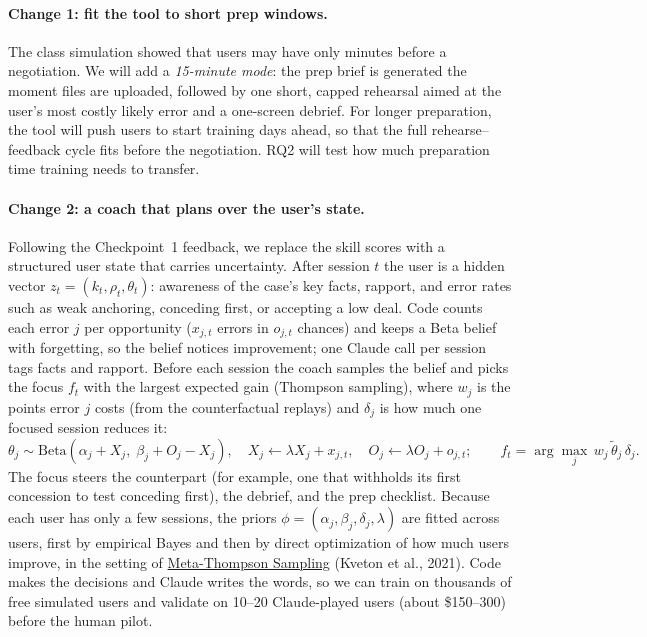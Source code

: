 \documentclass[10pt]{article}
\begin{document}
\paragraph{Change 1: fit the tool to short prep windows.} The class simulation showed that
users may have only minutes before a negotiation. We will add a \emph{15-minute mode}: the
prep brief is generated the moment files are uploaded, followed by one short, capped
rehearsal aimed at the user's most costly likely error and a one-screen debrief. For
longer preparation, the tool will push users to start training days ahead, so that the
full rehearse--feedback cycle fits before the negotiation. RQ2 will test how much
preparation time training needs to transfer.

\paragraph{Change 2: a coach that plans over the user's state.} Following the Checkpoint~1
feedback, we replace the skill scores with a structured user state that carries
uncertainty. After session $t$ the user is a hidden vector $z_t = (k_t, \rho_t, \theta_t)$:
awareness of the case's key facts, rapport, and error rates such as weak anchoring,
conceding first, or accepting a low deal. Code counts each error $j$ per opportunity
($x_{j,t}$ errors in $o_{j,t}$ chances) and keeps a Beta belief with forgetting, so the
belief notices improvement; one Claude call per session tags facts and rapport. Before
each session the coach samples the belief and picks the focus $f_t$ with the largest
expected gain (Thompson sampling), where $w_j$ is the points error $j$ costs (from the
counterfactual replays) and $\delta_j$ is how much one focused session reduces it:
\begin{equation}
\theta_j \sim \mathrm{Beta}\left(\alpha_j + X_j,\; \beta_j + O_j - X_j\right),\quad
X_j \leftarrow \lambda X_j + x_{j,t},\quad O_j \leftarrow \lambda O_j + o_{j,t};
\qquad
f_t = \arg\max_j\, w_j\, \tilde{\theta}_j\, \delta_j .
\end{equation}
The focus steers the counterpart (for example, one that withholds its first concession to
test conceding first), the debrief, and the prep checklist. Because each user has only a
few sessions, the priors $\phi = (\alpha_j, \beta_j, \delta_j, \lambda)$ are fitted across
users, first by empirical Bayes and then by direct optimization of how much users improve,
in the setting of \href{https://proceedings.mlr.press/v139/kveton21a.html}{Meta-Thompson
Sampling} (Kveton et al., 2021). Code makes the decisions and Claude writes the words, so
we can train on thousands of free simulated users and validate on 10--20 Claude-played
users (about \$150--300) before the human pilot.
\end{document}
